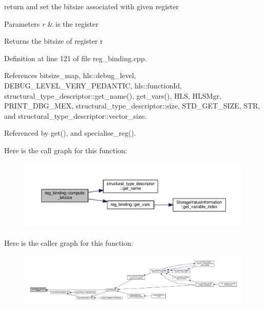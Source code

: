 return and set the bitsize associated with given register 


\begin{DoxyParams}{Parameters}
{\em r} & is the register \\
\hline
\end{DoxyParams}
\begin{DoxyReturn}{Returns}
the bitsize of register r 
\end{DoxyReturn}


Definition at line 121 of file reg\+\_\+binding.\+cpp.



References bitsize\+\_\+map, hls\+::debug\+\_\+level, D\+E\+B\+U\+G\+\_\+\+L\+E\+V\+E\+L\+\_\+\+V\+E\+R\+Y\+\_\+\+P\+E\+D\+A\+N\+T\+IC, hls\+::function\+Id, structural\+\_\+type\+\_\+descriptor\+::get\+\_\+name(), get\+\_\+vars(), H\+LS, H\+L\+S\+Mgr, P\+R\+I\+N\+T\+\_\+\+D\+B\+G\+\_\+\+M\+EX, structural\+\_\+type\+\_\+descriptor\+::size, S\+T\+D\+\_\+\+G\+E\+T\+\_\+\+S\+I\+ZE, S\+TR, and structural\+\_\+type\+\_\+descriptor\+::vector\+\_\+size.



Referenced by get(), and specialise\+\_\+reg().

Here is the call graph for this function\+:
\nopagebreak
\begin{figure}[H]
\begin{center}
\leavevmode
\includegraphics[width=350pt]{da/d7c/classreg__binding_a697ec0dfee640bc2ef57c102a7a8c7a3_cgraph}
\end{center}
\end{figure}
Here is the caller graph for this function\+:
\nopagebreak
\begin{figure}[H]
\begin{center}
\leavevmode
\includegraphics[width=350pt]{da/d7c/classreg__binding_a697ec0dfee640bc2ef57c102a7a8c7a3_icgraph}
\end{center}
\end{figure}
\mbox{\label{classreg__binding_ad6fd4336ceaa2e65955560fed8e0d41b}} 
